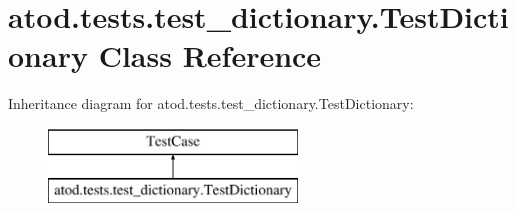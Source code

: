 \hypertarget{classatod_1_1tests_1_1test__dictionary_1_1_test_dictionary}{}\section{atod.\+tests.\+test\+\_\+dictionary.\+Test\+Dictionary Class Reference}
\label{classatod_1_1tests_1_1test__dictionary_1_1_test_dictionary}
Inheritance diagram for atod.\+tests.\+test\+\_\+dictionary.\+Test\+Dictionary\+:\begin{figure}[H]
\begin{center}
\leavevmode
\includegraphics[height=2.000000cm]{classatod_1_1tests_1_1test__dictionary_1_1_test_dictionary}
\end{center}
\end{figure}
